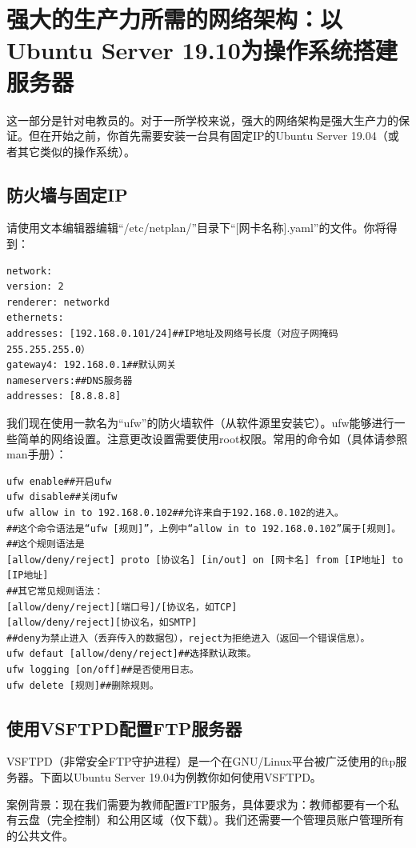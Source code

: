 \chapter{强大的生产力所需的网络架构：以Ubuntu Server 19.10为操作系统搭建服务器}
这一部分是针对电教员的。对于一所学校来说，强大的网络架构是强大生产力的保证。但在开始之前，你首先需要安装一台具有固定IP的Ubuntu Server 19.04（或者其它类似的操作系统）。
\section{防火墙与固定IP}
请使用文本编辑器编辑“/etc/netplan/”目录下“[网卡名称].yaml”的文件。你将得到：
\begin{verbatim}
network:
version: 2
renderer: networkd
ethernets:
addresses: [192.168.0.101/24]##IP地址及网络号长度（对应子网掩码255.255.255.0）
gateway4: 192.168.0.1##默认网关
nameservers:##DNS服务器
addresses: [8.8.8.8]
\end{verbatim}\par
我们现在使用一款名为“ufw”的防火墙软件（从软件源里安装它）。ufw能够进行一些简单的网络设置。注意更改设置需要使用root权限。常用的命令如（具体请参照man手册）：
\begin{verbatim}
ufw enable##开启ufw
ufw disable##关闭ufw
ufw allow in to 192.168.0.102##允许来自于192.168.0.102的进入。
##这个命令语法是“ufw [规则]”，上例中“allow in to 192.168.0.102”属于[规则]。
##这个规则语法是
[allow/deny/reject] proto [协议名] [in/out] on [网卡名] from [IP地址] to [IP地址]
##其它常见规则语法：
[allow/deny/reject][端口号]/[协议名，如TCP]
[allow/deny/reject][协议名，如SMTP]
##deny为禁止进入（丢弃传入的数据包），reject为拒绝进入（返回一个错误信息）。
ufw defaut [allow/deny/reject]##选择默认政策。
ufw logging [on/off]##是否使用日志。
ufw delete [规则]##删除规则。
\end{verbatim}
\section{使用VSFTPD配置FTP服务器}
VSFTPD（非常安全FTP守护进程）是一个在GNU/Linux平台被广泛使用的ftp服务器。下面以Ubuntu Server 19.04为例教你如何使用VSFTPD。\par
案例背景：现在我们需要为教师配置FTP服务，具体要求为：教师都要有一个私有云盘（完全控制）和公用区域（仅下载）。我们还需要一个管理员账户管理所有的公共文件。
